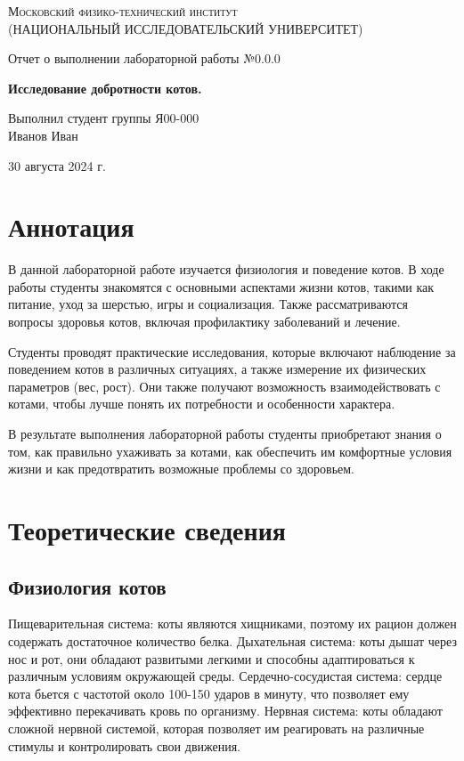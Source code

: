 \documentclass[12pt,a4paper]{article}
\def \TITLE {Отчет о выполнении лабораторной работы №0.0.0}
\def \SUBTITLE {Исследование добротности котов.}
\def \AUTHOR {Выполнил студент группы Я00-000\\ Иванов Иван}
\def \DATE {30 августа 2024 г.}
\begin{document}
\begin{titlepage}
	\centering
	\vspace{5cm}
	{\scshape\large Московский физико-технический институт \\
	(НАЦИОНАЛЬНЫЙ ИССЛЕДОВАТЕЛЬСКИЙ УНИВЕРСИТЕТ)}
	
	\vspace{4cm}
	{\LARGE \TITLE}
	
	\vspace{1cm}
	{\Huge\bf \SUBTITLE }
	
	\vspace{1cm}
	\vfill
	
\begin{flushright}
	{\LARGE \AUTHOR}
\end{flushright}
	

	\vfill

	\DATE
\end{titlepage}

\newpage

\section{Аннотация}
	В данной лабораторной работе изучается физиология и поведение котов. В ходе работы студенты знакомятся с основными аспектами жизни котов, такими как питание, уход за шерстью, игры и социализация. Также рассматриваются вопросы здоровья котов, включая профилактику заболеваний и лечение. 

Студенты проводят практические исследования, которые включают наблюдение за поведением котов в различных ситуациях, а также измерение их физических параметров (вес, рост). Они также получают возможность взаимодействовать с котами, чтобы лучше понять их потребности и особенности характера.

В результате выполнения лабораторной работы студенты приобретают знания о том, как правильно ухаживать за котами, как обеспечить им комфортные условия жизни и как предотвратить возможные проблемы со здоровьем.

\section{Теоретические сведения}
\subsection{Физиология котов}
        Пищеварительная система: коты являются хищниками, поэтому их рацион должен содержать достаточное количество белка.
        Дыхательная система: коты дышат через нос и рот, они обладают развитыми легкими и способны адаптироваться к различным условиям окружающей среды.
        Сердечно-сосудистая система: сердце кота бьется с частотой около 100-150 ударов в минуту, что позволяет ему эффективно перекачивать кровь по организму.
        Нервная система: коты обладают сложной нервной системой, которая позволяет им реагировать на различные стимулы и контролировать свои движения.
        
\end{document}
